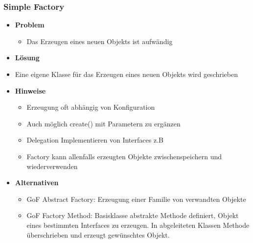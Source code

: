 \documentclass[../ZF_SWEN1.tex]{subfiles}
\begin{document}
\subsubsection{Simple Factory}
\begin{itemize}
	\item \textbf{Problem}
	\begin{itemize}
		\item Das Erzeugen eines neuen Objekts ist aufwändig
	\end{itemize}
	\item \textbf{Lösung}
		\item Eine eigene Klasse für das Erzeugen eines neuen Objekts wird geschrieben
	\item \textbf{Hinweise}
	\begin{itemize}
		\item Erzeugung oft abhängig von Konfiguration
		\item Auch möglich create() mit Parametern zu ergänzen
		\item Delegation Implementieren von Interfaces z.B
		\item Factory kann allenfalls erzeugten Objekte zwischenspeichern und wiederverwenden
	\end{itemize}
	\item \textbf{Alternativen}
	\begin{itemize}
		\item GoF Abstract Factory: Erzeugung einer Familie von verwandten Objekte
		\item GoF Factory Method: Basisklasse abstrakte Methode definiert, Objekt eines bestimmten Interfaces zu erzeugen. In abgeleiteten Klassen Methode überschrieben und erzeugt gewünschtes Objekt.
	\end{itemize}
\end{itemize}
\end{document}
